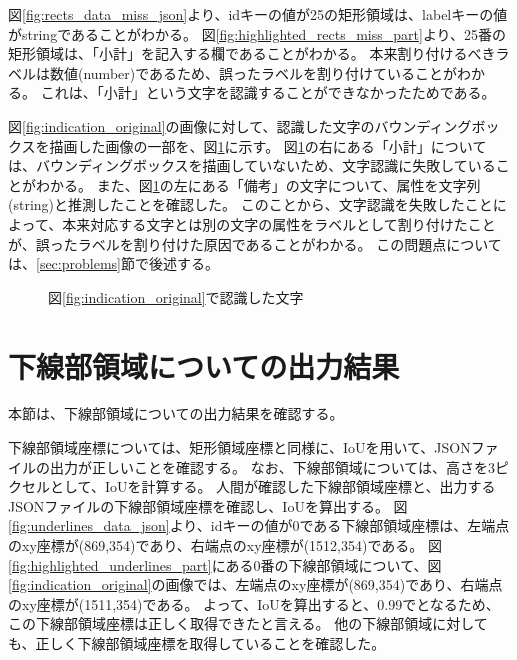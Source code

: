図\ref{fig:rects_data_miss_json}より、idキーの値が25の矩形領域は、labelキーの値がstringであることがわかる。
図\ref{fig:highlighted_rects_miss_part}より、25番の矩形領域は、「小計」を記入する欄であることがわかる。
本来割り付けるべきラベルは数値(number)であるため、誤ったラベルを割り付けていることがわかる。
これは、「小計」という文字を認識することができなかったためである。

図\ref{fig:indication_original}の画像に対して、認識した文字のバウンディングボックスを描画した画像の一部を、図\ref{fig:OCR_result}に示す。
図\ref{fig:OCR_result}の右にある「小計」については、バウンディングボックスを描画していないため、文字認識に失敗していることがわかる。
また、図\ref{fig:OCR_result}の左にある「備考」の文字について、属性を文字列(string)と推測したことを確認した。
このことから、文字認識を失敗したことによって、本来対応する文字とは別の文字の属性をラベルとして割り付けたことが、誤ったラベルを割り付けた原因であることがわかる。
この問題点については、\ref{sec:problems}節で後述する。

\begin{figure}[t]
    \begin{center}
        \caption{図\ref{fig:indication_original}で認識した文字}
        \label{fig:OCR_result}
    \end{center}
\end{figure}

\section{下線部領域についての出力結果}\label{sec:result_underline}
本節は、下線部領域についての出力結果を確認する。

下線部領域座標については、矩形領域座標と同様に、IoUを用いて、JSONファイルの出力が正しいことを確認する。
なお、下線部領域については、高さを3ピクセルとして、IoUを計算する。
人間が確認した下線部領域座標と、出力するJSONファイルの下線部領域座標を確認し、IoUを算出する。
図\ref{fig:underlines_data_json}より、idキーの値が0である下線部領域座標は、左端点のxy座標が(869,354)であり、右端点のxy座標が(1512,354)である。
図\ref{fig:highlighted_underlines_part}にある0番の下線部領域について、図\ref{fig:indication_original}の画像では、左端点のxy座標が(869,354)であり、右端点のxy座標が(1511,354)である。
よって、IoUを算出すると、0.99でとなるため、この下線部領域座標は正しく取得できたと言える。
他の下線部領域に対しても、正しく下線部領域座標を取得していることを確認した。

